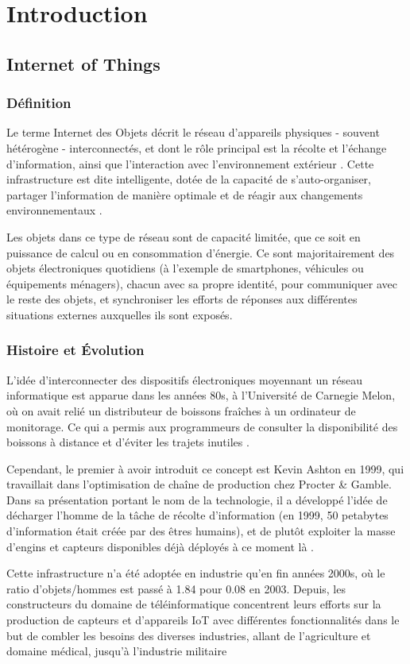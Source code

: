 \chapter{Introduction}

\section{Internet of Things}

\subsection{Définition}
Le terme Internet des Objets décrit le réseau d'appareils physiques - souvent hétérogène - interconnectés, et dont le rôle principal est la récolte et l'échange d'information, ainsi que l'interaction avec l'environnement extérieur \cite{patel2016}. Cette infrastructure est dite intelligente, dotée de la capacité de s'auto-organiser, partager l'information de manière optimale et de réagir aux changements environnementaux \cite{madakam2015}.\par
Les objets dans ce type de réseau sont de capacité limitée, que ce soit en puissance de calcul ou en consommation d'énergie. Ce sont majoritairement des objets électroniques quotidiens (à l'exemple de smartphones, véhicules ou équipements ménagers), chacun avec sa propre identité, pour communiquer avec le reste des objets, et synchroniser les efforts de réponses aux différentes situations externes auxquelles ils sont exposés.

\subsection{Histoire et Évolution}
L'idée d'interconnecter des dispositifs électroniques moyennant un réseau informatique est apparue dans les années 80s, à l'Université de Carnegie Melon, où on avait relié un distributeur de boissons fraîches à un ordinateur de monitorage. Ce qui a permis aux programmeurs de consulter la disponibilité des boissons à distance et d'éviter les trajets inutiles \cite{madakam2015}.\par
Cependant, le premier à avoir introduit ce concept est Kevin Ashton en 1999, qui travaillait dans l'optimisation de chaîne de production chez Procter \& Gamble. Dans sa présentation portant le nom de la technologie, il a développé l'idée de décharger l'homme de la tâche de récolte d'information (en 1999, 50 petabytes d'information était créée par des êtres humains), et de plutôt exploiter la masse d'engins et capteurs disponibles déjà déployés à ce moment là \cite{ashton2009}.\par
Cette infrastructure n'a été adoptée en industrie qu'en fin années 2000s, où le ratio d'objets/hommes est passé à 1.84 pour 0.08 en 2003. Depuis, les constructeurs du domaine de téléinformatique concentrent leurs efforts sur la production de capteurs et d'appareils IoT avec différentes fonctionnalités dans le but de combler les besoins des diverses industries, allant de l'agriculture et domaine médical, jusqu'à l'industrie militaire

